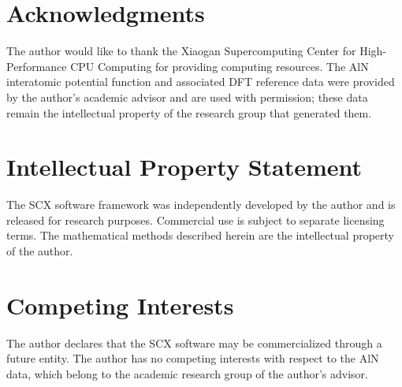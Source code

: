 \documentclass[twoside,prb,aps,floatfix,superscriptaddress,longbibliography]{revtex4-2}
\begin{document}
\section*{Acknowledgments}
The author would like to thank the Xiaogan Supercomputing Center for High-Performance CPU Computing for providing computing resources. The AlN interatomic potential function and associated DFT reference data were provided by the author's academic advisor and are used with permission; these data remain the intellectual property of the research group that generated them.

\section*{Intellectual Property Statement}
The SCX software framework was independently developed by the author and is released  for research purposes. Commercial use is subject to separate licensing terms. The mathematical methods described herein are the intellectual property of the author.

\section*{Competing Interests}
The author declares that the SCX software may be commercialized through a future entity. The author has no competing interests with respect to the AlN data, which belong to the academic research group of the author's advisor.

\end{document}
